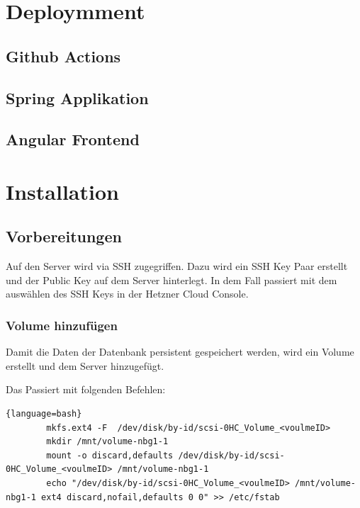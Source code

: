 \documentclass[11pt]{article}
\begin{document}
    \section{Deploymment}

    \subsection{Github Actions}

    \subsection{Spring Applikation}

    \subsection{Angular Frontend}


    \section{Installation}

    \subsection{Vorbereitungen}
    Auf den Server wird via SSH zugegriffen. Dazu wird ein SSH Key Paar erstellt und der Public Key auf dem Server hinterlegt.
    In dem Fall passiert mit dem auswählen des SSH Keys in der Hetzner Cloud Console.

    \subsubsection{Volume hinzufügen}
    Damit die Daten der Datenbank persistent gespeichert werden, wird ein Volume erstellt und dem Server hinzugefügt.

    Das Passiert mit folgenden Befehlen:
    \begin{lstlisting}{language=bash}
        mkfs.ext4 -F  /dev/disk/by-id/scsi-0HC_Volume_<voulmeID>
        mkdir /mnt/volume-nbg1-1
        mount -o discard,defaults /dev/disk/by-id/scsi-0HC_Volume_<voulmeID> /mnt/volume-nbg1-1
        echo "/dev/disk/by-id/scsi-0HC_Volume_<voulmeID> /mnt/volume-nbg1-1 ext4 discard,nofail,defaults 0 0" >> /etc/fstab
    \end{lstlisting}
\end{document}

